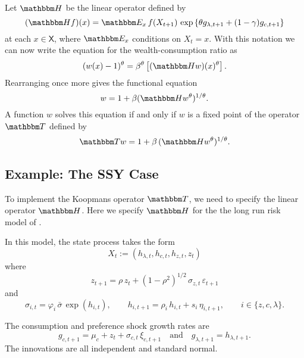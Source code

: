 \documentclass[12pt, reqno]{amsart}
\newcommand{\1}{\mathbbm 1}
\newcommand{\TT}{\mathbbm T}
\newcommand{\HH}{\mathbbm H}
\newcommand{\EE}{\mathbbm E}
\newcommand{\XX}{\mathsf X}
\renewcommand{\phi}{\varphi}
\renewcommand{\epsilon}{\varepsilon}
\theoremstyle{plain}
\theoremstyle{definition}
\begin{document}
Let $\HH$ be the linear operator defined by
%
\begin{equation}\label{eq:defk}
    (\HH f)(x) = \EE_x 
        \, f(X_{t+1})  \,
        \exp
        \left\{ 
            \theta g_{\lambda, t+1} + (1-\gamma) g_{c, t+1}
        \right\}
\end{equation}
%
at each $x \in \XX$,  where $\EE_x$ conditions on $X_t = x$.  With this notation
we can now write the equation for the wealth-consumption ratio as
%
\begin{equation}
    (w(x)-1)^\theta
    = \beta^{\theta}
    \left[
        (\HH w)(x)^\theta
    \right].
    \label{eq:wcnt}
\end{equation}
%
Rearranging once more gives the functional equation
%
\begin{equation}
    w = 1 + \beta ( \HH w^\theta )^{1/\theta}.
    \label{eq:fe}
\end{equation}
%
A function $w$ solves this equation if and only if $w$ is a fixed point
of the operator $\TT$ defined by 
%
\begin{equation}\label{eq:wcop}
    \TT w = 1 + \beta \,  (\HH w^\theta)^{1/\theta}.
\end{equation}
%



\subsection{Example: The SSY Case}

To implement the Koopmans operator $\TT$, we need to specify the linear operator
$\HH$.  Here we specify $\HH$ for the 
the long run risk model of \cite{schorfheide2018identifying}.  

In this model, the state process takes the form 
%
\begin{equation}\label{eq:state}
    X_t := (h_{\lambda, t}, h_{c, t}, h_{z, t}, z_t)  
\end{equation}
%
where
\begin{equation*}
    z_{t+1} = \rho \, z_t + (1 - \rho^2)^{1/2} \, \sigma_{z, t} \, \epsilon_{t+1}
\end{equation*}
%
and
%
\begin{equation*}
    \sigma_{i,t} = \phi_i \, \bar{\sigma} \, \exp(h_{i,t}),
    \qquad
    h_{i, t+1} = \rho_i \, h_{i,t} + s_{i} \, \eta_{i, t+1},
    \qquad
    i \in \{z, c, \lambda\}.
\end{equation*}

The consumption and preference shock growth rates are
%
\begin{equation}\label{eq:ssygc}
    g_{c, t+1}
    = \mu_c + z_t + \sigma_{c, t} \, \xi_{c, t+1} 
    \quad \text{and} \quad
    g_{\lambda, t+1} = h_{\lambda, t+1}.
\end{equation}
%
The innovations are all independent and standard normal.  
\end{document}
